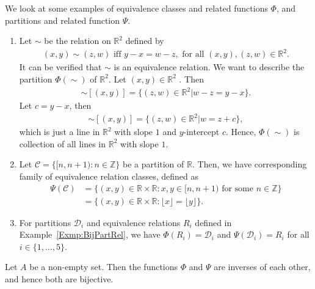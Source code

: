 \documentclass[a4paper,english,12pt]{article}
\begin{document}
\begin{exmp} We look at some examples of equivalence classes and related functions $\Phi$, and partitions and related function $\Psi$.
	\begin{enumerate}
		\item Let $\sim$ be the relation on $\mathbb{R}^2$ defined by 
		\begin{align*}
		(x, y) \sim (z, w) \text{ iff } y-x = w-z, \text{ for all } (x, y), (z, w) \in \mathbb{R}^2. 
		\end{align*}
		It can be verified that $\sim$ is an equivalence relation. We want to describe the partition $\Phi(\sim)$ of $\mathbb{R}^2$. Let $(x, y) \in \mathbb{R}^2$ . Then 
\begin{align*}
\sim[(x, y)] = \{(z, w) \in \mathbb{R}^2 | w - z = y - x\}. 
\end{align*}
Let $c = y - x$, then 
\begin{align*}
\sim[(x, y)] = \{(z, w) \in \mathbb{R}^2 | w = z + c\}, 
\end{align*}
which is just a line in $\mathbb{R}^2$ with slope $1$ and $y$-intercept $c$. Hence, $\Phi(\sim)$ is collection of all lines in $\mathbb{R}^2$ with slope $1$.
		\item Let $\mathcal{C} = \{[n, n + 1) : n \in \mathbb{Z}\}$ be a partition of $\mathbb{R}$. Then, we have corresponding family of equivalence relation classes, defined as
		\begin{align*}
		\Psi(\mathcal{C}) &= \{(x,y) \in \mathbb{R} \times \mathbb{R}: x,y \in [n,n+1) \text{ for some } n \in \mathbb{Z}\}\\ &= \{(x,y) \in \mathbb{R} \times \mathbb{R}: \lfloor x \rfloor = \lfloor y \rfloor\}.
		\end{align*}
		\item For partitions $\mathcal{D}_i$ and equivalence relations $R_i$ defined in Example~\ref{Exmp:BijPartRel}, we have $\Phi(R_i) = \mathcal{D}_i$ and $\Psi(\mathcal{D}_i) = R_i$ for all $i \in \{1, \ldots, 5\}$. 
	\end{enumerate}
\end{exmp}

\begin{thm} Let $A$ be a non-empty set. Then the functions $\Phi$ and $\Psi$ are inverses of each other, and hence both are bijective.	
\end{thm}
\end{document}
